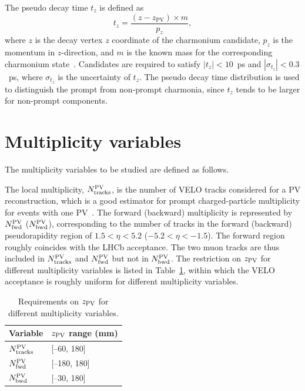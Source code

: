 \documentclass[12pt,a4paper]{article}
\begin{document}
The pseudo decay time $t_z$ is defined as
\begin{equation}
    \label{PseudoDecayTime}
    t_z = \frac{(z-z_{\mathrm{PV}}) \times{} m}{p_z},
\end{equation}
where $z$ is the decay vertex $z$ coordinate of the charmonium candidate, $p_z$ is the momentum in $z$-direction, and $m$ is the known mass for the corresponding charmonium state~\cite{Workman:2022ynf}. Candidates are required to satisfy $|t_z|<10$~ps and $|\sigma_{t_z}|<0.3$~ps, where $\sigma_{t_z}$ is the uncertainty of $t_z$. The pseudo decay time distribution is used to distinguish the prompt from non-prompt charmonia, since $t_z$ tends to be larger for non-prompt components.

\section{Multiplicity variables}
\label{sec:mul}
The multiplicity variables to be studied are defined as follows. 

The local multiplicity, $N_{\rm tracks}^{\rm PV}$,  is the number of VELO tracks considered for a PV reconstruction, which is a good estimator for prompt charged-particle multiplicity  for events with one PV~\cite{Aaij:2014zzy, Kucharczyk:1756296}. The forward (backward) multiplicity is represented by $N_{\rm fwd}^{\rm PV}$ ($N_{\rm bwd}^{\rm PV}$), corresponding to the number of tracks in the forward (backward) pseudorapidity region of $1.5<\eta<5.2$ ($-5.2<\eta<-1.5$). The forward region roughly coincides with the LHCb acceptance. The two muon tracks are thus included in $N_{\rm tracks}^{\rm PV}$ and $N_{\rm fwd}^{\rm PV}$ but not in $N_{\rm bwd}^{\rm PV}$. The restriction on $z_{\rm PV}$ for different multiplicity variables is listed in Table~\ref{T1}, within which the VELO acceptance is roughly uniform for different multiplicity variables. 
\begin{table}[H]
\caption{Requirements on $z_{\rm PV}$ for different multiplicity variables.}
\begin{center}
\begin{tabular}{ll}
\hline
	Variable & $z_{\rm PV}$ range (mm)\\
\hline
         $N_{\rm tracks}^{\rm PV}$ & [--60, 180]\\
         $N_{\rm fwd}^{\rm PV}$ & [--180, 180] \\
         $N_{\rm bwd}^{\rm PV}$ & [--30, 180] \\
\hline
\end{tabular}
\end{center}
\label{T1}
\end{table}
\end{document}
